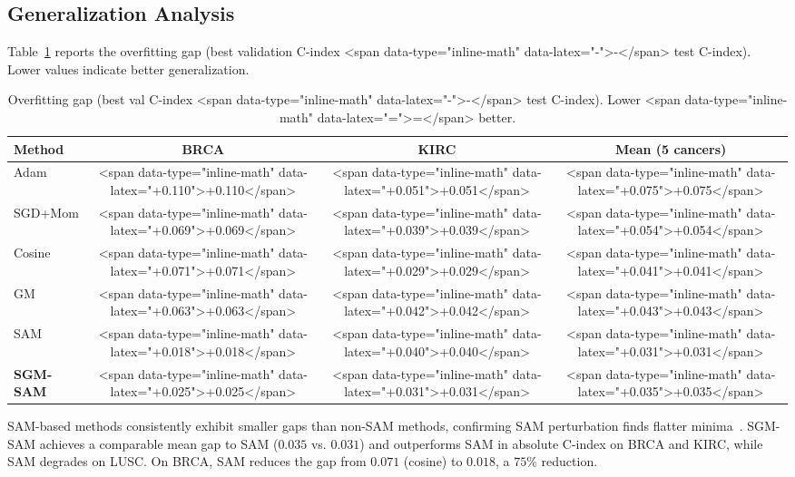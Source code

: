 \documentclass[10pt]{article}\usepackage[utf8]{inputenc}\usepackage[T1]{fontenc}\usepackage{amsmath,amssymb,amsfonts,bm}\usepackage{booktabs}\usepackage{multirow}\usepackage{array}\usepackage{graphicx}\usepackage{algorithm}\usepackage{algorithmic}\usepackage{xcolor}\usepackage[margin=1in]{geometry}\usepackage{microtype}
\begin{document}
\subsection{Generalization Analysis}
Table~\ref{tab:gap} reports the overfitting gap (best validation C-index <span data-type="inline-math" data-latex="-">-</span> test C-index). Lower values indicate better generalization.

\begin{table}[t]\centering\small
\caption{Overfitting gap (best val C-index <span data-type="inline-math" data-latex="-">-</span> test C-index). Lower <span data-type="inline-math" data-latex="=">=</span> better.}\label{tab:gap}
\begin{tabular}{lccc}\toprule
Method & BRCA & KIRC & Mean (5 cancers) \\\midrule
Adam & <span data-type="inline-math" data-latex="+0.110">+0.110</span> & <span data-type="inline-math" data-latex="+0.051">+0.051</span> & <span data-type="inline-math" data-latex="+0.075">+0.075</span> \\
SGD+Mom & <span data-type="inline-math" data-latex="+0.069">+0.069</span> & <span data-type="inline-math" data-latex="+0.039">+0.039</span> & <span data-type="inline-math" data-latex="+0.054">+0.054</span> \\
Cosine & <span data-type="inline-math" data-latex="+0.071">+0.071</span> & <span data-type="inline-math" data-latex="+0.029">+0.029</span> & <span data-type="inline-math" data-latex="+0.041">+0.041</span> \\
GM & <span data-type="inline-math" data-latex="+0.063">+0.063</span> & <span data-type="inline-math" data-latex="+0.042">+0.042</span> & <span data-type="inline-math" data-latex="+0.043">+0.043</span> \\
SAM & <span data-type="inline-math" data-latex="+0.018">+0.018</span> & <span data-type="inline-math" data-latex="+0.040">+0.040</span> & <span data-type="inline-math" data-latex="+0.031">+0.031</span> \\
\textbf{SGM-SAM} & <span data-type="inline-math" data-latex="+0.025">+0.025</span> & <span data-type="inline-math" data-latex="+0.031">+0.031</span> & <span data-type="inline-math" data-latex="+0.035">+0.035</span> \\\bottomrule
\end{tabular}
\end{table}

SAM-based methods consistently exhibit smaller gaps than non-SAM methods, confirming SAM perturbation finds flatter minima~\cite{foret2021sam,hochreiter1997flat}. SGM-SAM achieves a comparable mean gap to SAM ($0.035$ vs. $0.031$) and outperforms SAM in absolute C-index on BRCA and KIRC, while SAM degrades on LUSC. On BRCA, SAM reduces the gap from $0.071$ (cosine) to $0.018$, a $75\%$ reduction.
\end{document}
